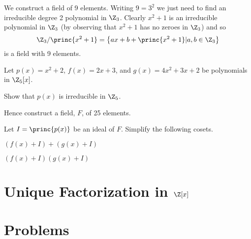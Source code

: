 \begin{example}
    We construct a field of 9 elements. Writing $9 = 3^2$ we just need to find an irreducible degree 2 polynomial in $\Z_3$. Clearly $x^2 + 1$ is an irreducible polynomial in $\Z_3$ (by observing that $x^2 + 1$ has no zeroes in $\Z_3$) and so
    \[
        \Z_3/\princ{x^2+1} = \left\{ax+b + \princ{x^2+1} \vert a,b \in \Z_3\right\}
    \]
    is a field with 9 elements.
\end{example}

\begin{exercise}
    Let $p(x) = x^2 + 2$, $f(x) = 2x+3$, and $g(x) = 4x^2+3x+2$ be polynomials in $\Z_5[x]$.
    \begin{partquestions}{\roman*}
        \item Show that $p(x)$ is irreducible in $\Z_5$.
        \item Hence construct a field, $F$, of 25 elements.
        \item Let $I = \princ{p(x)}$ be an ideal of $F$.  Simplify the following cosets.
        \begin{partquestions}{\alph*}
            \item $(f(x) + I) + (g(x) + I)$
            \item $(f(x) + I)(g(x) + I)$
        \end{partquestions}
    \end{partquestions}
\end{exercise}

\section{Unique Factorization in $\Z[x]$}

\newpage

\section{Problems}
